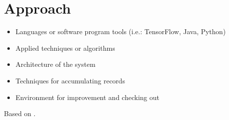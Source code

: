 \chapter{Approach}
    \begin{itemize}
        \item Languages or software program tools (i.e.: TensorFlow, Java, Python)
        \item Applied techniques or algorithms
        \item Architecture of the system
        \item Techniques for accumulating records
        \item Environment for improvement and checking out
    \end{itemize}
    Based on \cite{AssignmentExpert2026}.